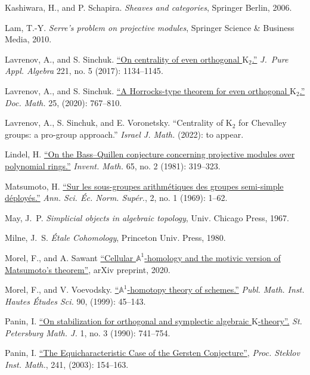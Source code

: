 \documentclass[oneside, 11pt]{amsart}
\numberwithin{equation}{section}
\newcommand{\K}{{\mathrm{K}}}
\theoremstyle{definition}
\theoremstyle{definition}
\theoremstyle{remark}
\begin{document}
\begin{thebibliography}{0}
Kashiwara, H., and P. Schapira. \textit{Sheaves and categories}, Springer Berlin, 2006.

Lam, T.-Y. \textit{Serre's problem on projective modules}, Springer Science \& Business Media, 2010.

Lavrenov, A., and S. Sinchuk.
\href{https://arxiv.org/pdf/1606.00272.pdf}{``On centrality of even orthogonal $\K_2$.''}
\textit{J.~Pure Appl. Algebra} 221, no. {5} (2017): {1134--1145}.

Lavrenov, A., and S. Sinchuk.
\href{http://dx.doi.org/10.25537/dm.2020v25.767-809}{``A Horrocks-type theorem for even orthogonal $\K_2$.''}
\textit{Doc. Math.} 25, (2020): {767--810}.

Lavrenov, A., S. Sinchuk, and E. Voronetsky.
``Centrality of $\K_2$ for Chevalley groups: a pro-group approach.''
\textit{Israel J. Math.} (2022): to appear.

 Lindel, H. \href{http://eudml.org/doc/142853}{``On the Bass--Quillen conjecture concerning projective modules over polynomial rings.''} \textit{Invent. Math.} 65, no. 2 (1981): 319--323.  

Matsumoto, H.
\href{http://eudml.org/doc/81843}{``Sur les sous-groupes arithm{\'e}tiques des groupes semi-simple d{\'e}ploy{\'e}s.''}
\textit{Ann. Sci. {\'E}c. Norm. Sup{\'e}r.}, 2, no. 1 (1969): 1--62.

May, J.~P.
\textit{Simplicial objects in algebraic topology}, Univ. Chicago Press, 1967.

Milne, J.~S. \textit{{\'E}tale Cohomology}, Princeton Univ. Press, 1980.

Morel, F., and A. Sawant
\href{https://arxiv.org/abs/2007.14770}{``Cellular $\mathbb{A}^1$-homology and the motivic version of Matsumoto's theorem''}, arXiv preprint, 2020.

Morel, F., and V. Voevodsky.
\href{http://www.numdam.org/item/PMIHES_1999__90__45_0/}{``$\mathbb{A}^1$-homotopy theory of schemes.''} \textit{Publ. Math. Inst. Hautes {\'E}tudes Sci.} 90, (1999): {45--143}.

Panin, I.
\href{http://www.mathnet.ru/links/a46c953dc23ca4b3c44578c283cd59c8/aa27.pdf}{``On stabilization for orthogonal and symplectic algebraic $\K$-theory''.}
\textit{St. Petersburg Math. J.} 1, no. 3 (1990): 741--754.

 Panin, I. \href{http://mi.mathnet.ru/tm394}{``The Equicharacteristic Case of the Gersten Conjecture''},
\textit{Proc. Steklov Inst. Math.}, 241, (2003): 154--163.


\end{thebibliography}
\end{document}

